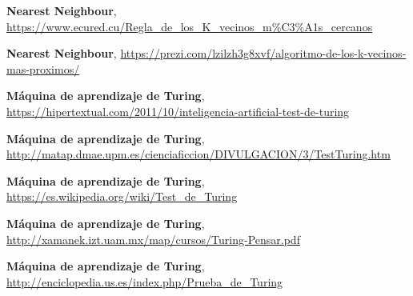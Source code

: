 \documentclass[a4paper, 11pt]{article} %
\begin{document}
\begin{thebibliography}{9}
 	\textbf{Nearest Neighbour},
 \url{https://www.ecured.cu/Regla_de_los_K_vecinos_m%C3%A1s_cercanos}
 
 	\textbf{Nearest Neighbour},
 \url{https://prezi.com/lzilzh3g8xvf/algoritmo-de-los-k-vecinos-mas-proximos/}
 
 	\textbf{Máquina de aprendizaje de Turing},
 \url{https://hipertextual.com/2011/10/inteligencia-artificial-test-de-turing}
 
 	\textbf{Máquina de aprendizaje de Turing},
 \url{http://matap.dmae.upm.es/cienciaficcion/DIVULGACION/3/TestTuring.htm}
 
 	\textbf{Máquina de aprendizaje de Turing},
 \url{https://es.wikipedia.org/wiki/Test_de_Turing}
 
 	\textbf{Máquina de aprendizaje de Turing},
 \url{http://xamanek.izt.uam.mx/map/cursos/Turing-Pensar.pdf}
 
 	\textbf{Máquina de aprendizaje de Turing},
 \url{http://enciclopedia.us.es/index.php/Prueba_de_Turing}
 
    
\end{thebibliography}
\end{document}
